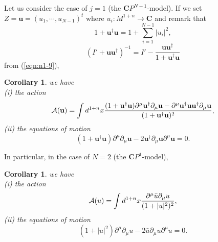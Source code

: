 \documentclass[makeidx,12pt,openany]{report}
\newtheorem{cor}[df]{Corollary}
\begin{document}
Let us consider the case of $j=1$ (the ${\mathbf{C}}P^{N-1}$-model). 
If we set $Z={\mathbf{u}}=(u_1,\cdots ,u_{N-1})^t$ where $u_i:M^{1+n} 
\longrightarrow {\mathbf{C}}$ and remark that
$$
1+{\mathbf{u}}^{\dag}{\mathbf{u}}=1+\sum_{i=1}^{N-1}|u_i|^2,
$$
$$
(I'+{\mathbf{u}} {\mathbf{u}}^{\dag})^{-1}=I'-\frac{{\mathbf{u}} {\mathbf{u}}^{\dag}}{1+{\mathbf{u}}^{\dag}{\mathbf{u}}}
$$
from (\ref{eqn:n1-9}),
\begin{cor}
we have \\ 
(i) the action
\begin{equation}
 \mbox{$\cal{A}$}({\mathbf{u}})
  =\int d^{1+n} x 
    \frac{(1+{\mathbf{u}}^{\dag}{\mathbf{u}})\partial^{\mu}{\mathbf{u}}^{\dag}\partial_{\mu}{\mathbf{u}}-
          \partial^{\mu}{\mathbf{u}}^{\dag}{\mathbf{u}} {\mathbf{u}}^{\dag}\partial_{\mu}{\mathbf{u}}}{
           (1+{\mathbf{u}}^{\dag}{\mathbf{u}})^2},
\end{equation}
(ii) the equations of motion
\begin{equation}
 (1+{\mathbf{u}}^{\dag}{\mathbf{u}})\partial^{\mu}\partial_{\mu}{\mathbf{u}}
 -2{\mathbf{u}}^{\dag}\partial_{\mu}{\mathbf{u}}\partial^{\mu}{\mathbf{u}}=0.
\end{equation}
\end{cor}
In particular, in the case of $N=2$ (the ${\mathbf{C}}P^1$-model),
\begin{cor}
we have \\
(i) the action
\begin{equation}
 \mbox{$\cal{A}$}(u)
  =\int d^{1+n} x 
    \frac{\partial^{\mu}\bar{u}\partial_{\mu}u}{
           (1+|u|^2)^2},
 \label{eqn:n2-10}
\end{equation}
(ii) the equations of motion
\begin{equation}
 (1+|u|^2)\partial^{\mu}\partial_{\mu}u
 -2\bar{u}\partial_{\mu}u\partial^{\mu}u=0.
 \label{eqn:n2-11}
\end{equation}
\end{cor}
\end{document}
